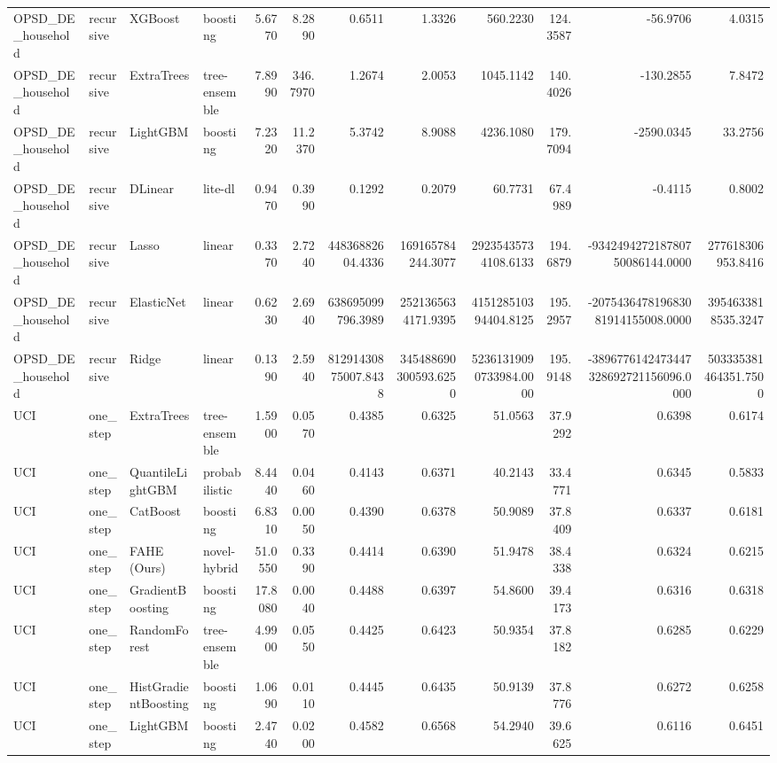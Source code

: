 \begin{tabular}{llllrrrrrrrr}
OPSD_DE_household & recursive & XGBoost & boosting & 5.6770 & 8.2890 & 0.6511 & 1.3326 & 560.2230 & 124.3587 & -56.9706 & 4.0315 \\
OPSD_DE_household & recursive & ExtraTrees & tree-ensemble & 7.8990 & 346.7970 & 1.2674 & 2.0053 & 1045.1142 & 140.4026 & -130.2855 & 7.8472 \\
OPSD_DE_household & recursive & LightGBM & boosting & 7.2320 & 11.2370 & 5.3742 & 8.9088 & 4236.1080 & 179.7094 & -2590.0345 & 33.2756 \\
OPSD_DE_household & recursive & DLinear & lite-dl & 0.9470 & 0.3990 & 0.1292 & 0.2079 & 60.7731 & 67.4989 & -0.4115 & 0.8002 \\
OPSD_DE_household & recursive & Lasso & linear & 0.3370 & 2.7240 & 44836882604.4336 & 169165784244.3077 & 29235435734108.6133 & 194.6879 & -934249427218780750086144.0000 & 277618306953.8416 \\
OPSD_DE_household & recursive & ElasticNet & linear & 0.6230 & 2.6940 & 638695099796.3989 & 2521365634171.9395 & 415128510394404.8125 & 195.2957 & -207543647819683081914155008.0000 & 3954633818535.3247 \\
OPSD_DE_household & recursive & Ridge & linear & 0.1390 & 2.5940 & 81291430875007.8438 & 345488690300593.6250 & 52361319090733984.0000 & 195.9148 & -3896776142473447328692721156096.0000 & 503335381464351.7500 \\
UCI & one_step & ExtraTrees & tree-ensemble & 1.5900 & 0.0570 & 0.4385 & 0.6325 & 51.0563 & 37.9292 & 0.6398 & 0.6174 \\
UCI & one_step & QuantileLightGBM & probabilistic & 8.4440 & 0.0460 & 0.4143 & 0.6371 & 40.2143 & 33.4771 & 0.6345 & 0.5833 \\
UCI & one_step & CatBoost & boosting & 6.8310 & 0.0050 & 0.4390 & 0.6378 & 50.9089 & 37.8409 & 0.6337 & 0.6181 \\
UCI & one_step & FAHE (Ours) & novel-hybrid & 51.0550 & 0.3390 & 0.4414 & 0.6390 & 51.9478 & 38.4338 & 0.6324 & 0.6215 \\
UCI & one_step & GradientBoosting & boosting & 17.8080 & 0.0040 & 0.4488 & 0.6397 & 54.8600 & 39.4173 & 0.6316 & 0.6318 \\
UCI & one_step & RandomForest & tree-ensemble & 4.9900 & 0.0550 & 0.4425 & 0.6423 & 50.9354 & 37.8182 & 0.6285 & 0.6229 \\
UCI & one_step & HistGradientBoosting & boosting & 1.0690 & 0.0110 & 0.4445 & 0.6435 & 50.9139 & 37.8776 & 0.6272 & 0.6258 \\
UCI & one_step & LightGBM & boosting & 2.4740 & 0.0200 & 0.4582 & 0.6568 & 54.2940 & 39.6625 & 0.6116 & 0.6451 \\

\end{tabular}

